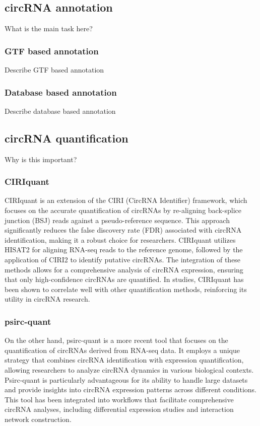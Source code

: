 \subsection{circRNA annotation}
What is the main task here?

\subsubsection{GTF based annotation}
Describe GTF based annotation

\subsubsection{Database based annotation}
Describe database based annotation

\subsection{circRNA quantification}

Why is this important?

\subsubsection{CIRIquant}
CIRIquant is an extension of the CIRI (CircRNA Identifier) framework, which
focuses on the accurate quantification of circRNAs by re-aligning back-splice
junction (BSJ) reads against a pseudo-reference sequence. This approach
significantly reduces the false discovery rate (FDR) associated with circRNA
identification, making it a robust choice for researchers\supercite{zhang_accurate_2020}.
CIRIquant utilizes HISAT2 for aligning RNA-seq reads to the reference genome,
followed by the application of CIRI2 to identify putative circRNAs. The
integration of these methods allows for a comprehensive analysis of circRNA
expression, ensuring that only high-confidence circRNAs are
quantified\supercite{munz_exonintron_2021,made_circrna-mirna-mrna_2023}. In
studies, CIRIquant has been shown to correlate well
with other quantification methods, reinforcing its utility in circRNA
research\supercite{zhang_accurate_2020}.

\subsubsection{psirc-quant}
On the other hand, psirc-quant is a more recent tool that focuses on the
quantification of circRNAs derived from RNA-seq data. It employs a unique
strategy that combines circRNA identification with expression quantification,
allowing researchers to analyze circRNA dynamics in various biological contexts.
Psirc-quant is particularly advantageous for its ability to handle large
datasets and provide insights into circRNA expression patterns across different
conditions\supercite{yu_quantifying_2021}. This tool has been integrated into workflows
that facilitate comprehensive circRNA analyses, including differential
expression studies and interaction network construction\supercite{zhang_expression_2022}.

